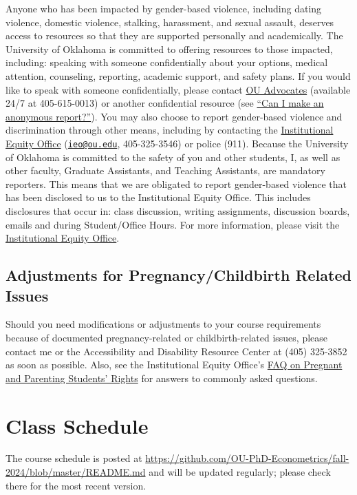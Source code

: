 \documentclass[11pt,english]{article}
\begin{document}
Anyone who has been impacted by gender-based violence, including dating violence, domestic violence, stalking, harassment, and sexual assault, deserves access to resources so that they are supported personally and academically. The University of Oklahoma is committed to offering resources to those impacted, including: speaking with someone confidentially about your options, medical attention, counseling, reporting, academic support, and safety plans. If you would like to speak with someone confidentially, please contact \href{https://www.ou.edu/gec/gender-based-violence/advocates}{OU Advocates} (available 24/7 at 405-615-0013) or another confidential resource (see \href{https://www.ou.edu/gec/gender-based-violence/learn-more}{``Can I make an anonymous report?''}). You may also choose to report gender-based violence and discrimination through other means, including by contacting the \href{http://www.ou.edu/eoo}{Institutional Equity Office} (\href{mailto:ieo@ou.edu}{\texttt{ieo@ou.edu}}, 405-325-3546) or police (911). Because the University of Oklahoma is committed to the safety of you and other students, I, as well as other faculty, Graduate Assistants, and Teaching Assistants, are mandatory reporters. This means that we are obligated to report gender-based violence that has been disclosed to us to the Institutional Equity Office. This includes disclosures that occur in: class discussion, writing assignments, discussion boards, emails and during Student/Office Hours. For more information, please visit the \href{http://www.ou.edu/eoo}{Institutional Equity Office}.

\subsection*{Adjustments for Pregnancy/Childbirth Related Issues}

Should you need modifications or adjustments to your course requirements because of documented pregnancy-related or childbirth-related issues, please contact me or the Accessibility and Disability Resource Center at (405) 325-3852 as soon as possible. Also, see the Institutional Equity Office's \href{http://www.ou.edu/eoo/faqs/pregnancy-faqs.html}{FAQ on Pregnant and Parenting Students' Rights} for answers to commonly asked questions.

\section*{Class Schedule}
The course schedule is posted at \url{https://github.com/OU-PhD-Econometrics/fall-2024/blob/master/README.md} and will be updated regularly; please check there for the most recent version.
\end{document}
